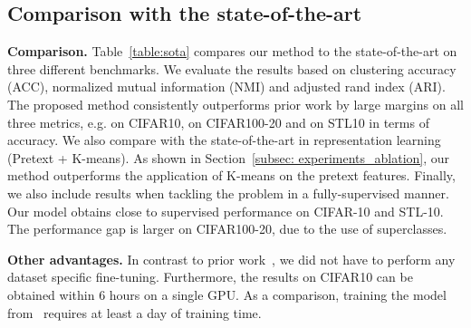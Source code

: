 \documentclass[runningheads]{llncs}
\begin{document}
\subsection{Comparison with the state-of-the-art}
\label{subsec: experiments_sota}
\noindent\textbf{Comparison.} Table~\ref{table:sota} compares our method to the state-of-the-art on three different benchmarks. We evaluate the results based on clustering accuracy (ACC), normalized mutual information (NMI) and adjusted rand index (ARI). The proposed method consistently outperforms prior work by large margins on all three metrics, e.g.  on CIFAR10,  on CIFAR100-20 and  on STL10 in terms of accuracy. We also compare with the state-of-the-art in representation learning~\cite{chen2020simple} (Pretext + K-means). As shown in Section~\ref{subsec: experiments_ablation}, our method outperforms the application of K-means on the pretext features. Finally, we also include results when tackling the problem in a fully-supervised manner. Our model obtains close to supervised performance on CIFAR-10 and STL-10. The performance gap is larger on CIFAR100-20, due to the use of superclasses. 

\noindent\textbf{Other advantages.} In contrast to prior work~\cite{DAC,IIC,hu2017learning}, we did not have to perform any dataset specific fine-tuning. Furthermore, the results on CIFAR10 can be obtained within 6 hours on a single GPU. As a comparison, training the model from~\cite{IIC} requires at least a day of training time.
\end{document}
